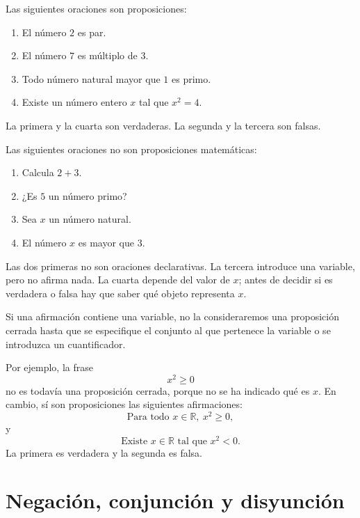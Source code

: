 \begin{ejemplo}
Las siguientes oraciones son proposiciones:
\begin{enumerate}
  \item El número $2$ es par.
  \item El número $7$ es múltiplo de $3$.
  \item Todo número natural mayor que $1$ es primo.
  \item Existe un número entero $x$ tal que $x^2=4$.
\end{enumerate}
La primera y la cuarta son verdaderas. La segunda y la tercera son falsas.
\end{ejemplo}

\begin{contraejemplo}
Las siguientes oraciones no son proposiciones matemáticas:
\begin{enumerate}
  \item Calcula $2+3$.
  \item ¿Es $5$ un número primo?
  \item Sea $x$ un número natural.
  \item El número $x$ es mayor que $3$.
\end{enumerate}
Las dos primeras no son oraciones declarativas. La tercera introduce una variable, pero no afirma nada. La cuarta depende del valor de $x$; antes de decidir si es verdadera o falsa hay que saber qué objeto representa $x$.
\end{contraejemplo}

\begin{convencion}
Si una afirmación contiene una variable, no la consideraremos una proposición cerrada hasta que se especifique el conjunto al que pertenece la variable o se introduzca un cuantificador.
\end{convencion}

Por ejemplo, la frase
\[
  x^2 \geq 0
\]
no es todavía una proposición cerrada, porque no se ha indicado qué es $x$. En cambio, sí son proposiciones las siguientes afirmaciones:
\[
  \text{Para todo } x\in\mathbb{R},\ x^2\geq 0,
\]
y
\[
  \text{Existe } x\in\mathbb{R} \text{ tal que } x^2<0.
\]
La primera es verdadera y la segunda es falsa.

\section{Negación, conjunción y disyunción}
\label{sec:negacion-conjuncion}


